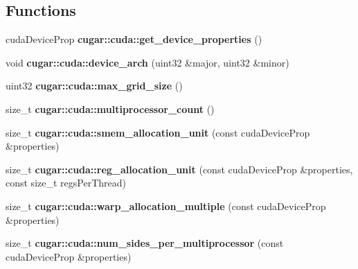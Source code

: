 \subsection*{Functions}
\begin{DoxyCompactItemize}
\item 
\mbox{\label{group___c_u_d_a_module_ga46be51409e924bbc69c991d2779afd26}} 
cuda\+Device\+Prop {\bfseries cugar\+::cuda\+::get\+\_\+device\+\_\+properties} ()
\item 
\mbox{\label{group___c_u_d_a_module_gaf7c77b8498ef4a41014b9a88f5627e4a}} 
void {\bfseries cugar\+::cuda\+::device\+\_\+arch} (uint32 \&major, uint32 \&minor)
\item 
\mbox{\label{group___c_u_d_a_module_ga94d7cfde2abde49447c13d635c945ea4}} 
uint32 {\bfseries cugar\+::cuda\+::max\+\_\+grid\+\_\+size} ()
\item 
\mbox{\label{group___c_u_d_a_module_gaf8a91a0844fc1cf3f404ce19695b9ce7}} 
size\+\_\+t {\bfseries cugar\+::cuda\+::multiprocessor\+\_\+count} ()
\item 
\mbox{\label{group___c_u_d_a_module_gae6b175b9b52df10747d3710f40ab3951}} 
size\+\_\+t {\bfseries cugar\+::cuda\+::smem\+\_\+allocation\+\_\+unit} (const cuda\+Device\+Prop \&properties)
\item 
\mbox{\label{group___c_u_d_a_module_ga69a91eacb9ae895482f6bc7af687ac99}} 
size\+\_\+t {\bfseries cugar\+::cuda\+::reg\+\_\+allocation\+\_\+unit} (const cuda\+Device\+Prop \&properties, const size\+\_\+t regs\+Per\+Thread)
\item 
\mbox{\label{group___c_u_d_a_module_ga6455fbfae7c05e49dfcfe2e59d38c9ca}} 
size\+\_\+t {\bfseries cugar\+::cuda\+::warp\+\_\+allocation\+\_\+multiple} (const cuda\+Device\+Prop \&properties)
\item 
\mbox{\label{group___c_u_d_a_module_gabfd449e2fe09e7fbd3e98b975d3eb419}} 
size\+\_\+t {\bfseries cugar\+::cuda\+::num\+\_\+sides\+\_\+per\+\_\+multiprocessor} (const cuda\+Device\+Prop \&properties)
\item 

\end{DoxyCompactItemize}
